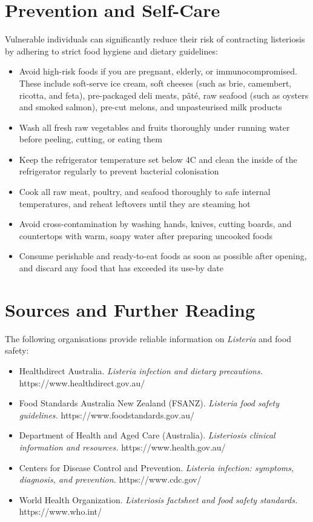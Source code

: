 \section*{Prevention and Self-Care}
Vulnerable individuals can significantly reduce their risk of contracting listeriosis by adhering to strict food hygiene and dietary guidelines:
\begin{itemize}
    \item Avoid high-risk foods if you are pregnant, elderly, or immunocompromised. These include soft-serve ice cream, soft cheeses (such as brie, camembert, ricotta, and feta), pre-packaged deli meats, pâté, raw seafood (such as oysters and smoked salmon), pre-cut melons, and unpasteurised milk products
    \item Wash all fresh raw vegetables and fruits thoroughly under running water before peeling, cutting, or eating them
    \item Keep the refrigerator temperature set below 4\textdegree C and clean the inside of the refrigerator regularly to prevent bacterial colonisation
    \item Cook all raw meat, poultry, and seafood thoroughly to safe internal temperatures, and reheat leftovers until they are steaming hot
    \item Avoid cross-contamination by washing hands, knives, cutting boards, and countertops with warm, soapy water after preparing uncooked foods
    \item Consume perishable and ready-to-eat foods as soon as possible after opening, and discard any food that has exceeded its use-by date
\end{itemize}

\section*{Sources and Further Reading}
The following organisations provide reliable information on \textit{Listeria} and food safety:
\begin{itemize}
    \item Healthdirect Australia. \textit{Listeria infection and dietary precautions.} https://www.healthdirect.gov.au/
    \item Food Standards Australia New Zealand (FSANZ). \textit{Listeria food safety guidelines.} https://www.foodstandards.gov.au/
    \item Department of Health and Aged Care (Australia). \textit{Listeriosis clinical information and resources.} https://www.health.gov.au/
    \item Centers for Disease Control and Prevention. \textit{Listeria infection: symptoms, diagnosis, and prevention.} https://www.cdc.gov/
    \item World Health Organization. \textit{Listeriosis factsheet and food safety standards.} https://www.who.int/
\end{itemize}
